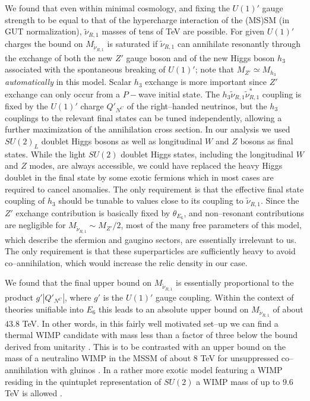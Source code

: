 \documentclass[a4paper,11pt]{article}
\begin{document}
We found that even within minimal cosmology, and fixing the $U(1)'$
gauge strength to be equal to that of the hypercharge interaction of
the (MS)SM (in GUT normalization), $\tilde \nu_{R,1}$ masses of tens
of TeV are possible.  For given $U(1)'$ charges the bound on
$M_{\tilde \nu_{R,1}}$ is saturated if $\tilde \nu_{R,1}$ can
annihilate resonantly through the exchange of both the new $Z'$ gauge
boson and of the new Higgs boson $h_3$ associated with the spontaneous
breaking of $U(1)'$; note that $M_{Z'} \simeq M_{h_3}$ {\em
  automatically} in this model. Scalar $h_3$ exchange is more
important since $Z'$ exchange can only occur from a $P-$wave initial
state. The $h_3 \tilde \nu_{R,1} \tilde \nu_{R,1}^*$ coupling is
fixed by the $U(1)'$ charge $Q'_{N^C}$ of the right--handed neutrinos,
but the $h_3$ couplings to the relevant final states can be tuned
independently, allowing a further maximization of the annihilation
cross section. In our analysis we used $SU(2)_{L}$ doublet Higgs
bosons as well as longitudinal $W$ and $Z$ bosons as final
states. While the light $SU(2)$ doublet Higgs states, including the
longitudinal $W$ and $Z$ modes, are always accessible, we could have
replaced the heavy Higgs doublet in the final state by some exotic
fermions which in most cases are required to cancel anomalies. The
only requirement is that the effective final state coupling of $h_3$
should be tunable to values close to its coupling to
$\tilde \nu_{R,1}$. Since the $Z'$ exchange contribution is basically
fixed by $\theta_{E_6}$, and non--resonant contributions are negligible
for $M_{\tilde\nu_{R,1}} \sim M_{Z'}/2$, most of the many free
parameters of this model, which describe the sfermion and gaugino
sectors, are essentially irrelevant to us. The only requirement is
that these superparticles are sufficiently heavy to avoid
co--annihilation, which would increase the relic density in our case.

We found that the final upper bound on $M_{\tilde \nu_{R,1}}$ is
essentially proportional to the product $g' |Q'_{N^C}|$, where $g'$ is
the $U(1)'$ gauge coupling. Within the context of theories unifiable
into $E_6$ this leads to an absolute upper bound on
$M_{\tilde \nu_{R,1}}$ of about $43.8$ TeV. In other words, in this
fairly well motivated set--up we can find a thermal WIMP candidate
with mass less than a factor of three below the bound derived from
unitarity \cite{Griest:1989wd}. This is to be contrasted with an upper
bound on the mass of a neutralino WIMP in the MSSM of about 8 TeV for
unsuppressed co--annihilation with gluinos \cite{Ellis:2015vaa}. In a
rather more exotic model featuring a WIMP residing in the quintuplet
representation of $SU(2)$ a WIMP mass of up to $9.6$ TeV is allowed
\cite{Cirelli:2009uv}. 
\end{document}
